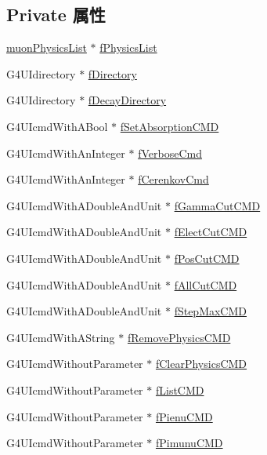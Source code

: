 \subsection*{Private 属性}
\begin{DoxyCompactItemize}
\item 
\hyperlink{classmuonPhysicsList}{muon\+Physics\+List} $\ast$ \hyperlink{classmuonPhysicsListMessenger_af6b4b50ac8d5f0745a42b138fdf872f9}{f\+Physics\+List}
\item 
G4\+U\+Idirectory $\ast$ \hyperlink{classmuonPhysicsListMessenger_a6ee7d768e62e1a00503d2060e9bee390}{f\+Directory}
\item 
G4\+U\+Idirectory $\ast$ \hyperlink{classmuonPhysicsListMessenger_a32435dcc45f4dde0fee1029b44e4aafa}{f\+Decay\+Directory}
\item 
G4\+U\+Icmd\+With\+A\+Bool $\ast$ \hyperlink{classmuonPhysicsListMessenger_a398a6f1a2d158f23ad9222bde55d3d9a}{f\+Set\+Absorption\+C\+MD}
\item 
G4\+U\+Icmd\+With\+An\+Integer $\ast$ \hyperlink{classmuonPhysicsListMessenger_ae032d089539eecc8f2a87eca11fa02f0}{f\+Verbose\+Cmd}
\item 
G4\+U\+Icmd\+With\+An\+Integer $\ast$ \hyperlink{classmuonPhysicsListMessenger_a9acd26079a72ece9f113dd902d49e906}{f\+Cerenkov\+Cmd}
\item 
G4\+U\+Icmd\+With\+A\+Double\+And\+Unit $\ast$ \hyperlink{classmuonPhysicsListMessenger_a17bfc84c38f5a7dbed27346d163f8211}{f\+Gamma\+Cut\+C\+MD}
\item 
G4\+U\+Icmd\+With\+A\+Double\+And\+Unit $\ast$ \hyperlink{classmuonPhysicsListMessenger_a13cc1337b7240bddf8441fe954ff3f05}{f\+Elect\+Cut\+C\+MD}
\item 
G4\+U\+Icmd\+With\+A\+Double\+And\+Unit $\ast$ \hyperlink{classmuonPhysicsListMessenger_aa7ebd0572c39450e325066477edac6dc}{f\+Pos\+Cut\+C\+MD}
\item 
G4\+U\+Icmd\+With\+A\+Double\+And\+Unit $\ast$ \hyperlink{classmuonPhysicsListMessenger_a562ca746cac592ca7ddd74d1c6ff9cb6}{f\+All\+Cut\+C\+MD}
\item 
G4\+U\+Icmd\+With\+A\+Double\+And\+Unit $\ast$ \hyperlink{classmuonPhysicsListMessenger_ad4e81b3c875881fd9ddf76ed6579a1ce}{f\+Step\+Max\+C\+MD}
\item 
G4\+U\+Icmd\+With\+A\+String $\ast$ \hyperlink{classmuonPhysicsListMessenger_aea5967d0469b160e5cc794f526b237ed}{f\+Remove\+Physics\+C\+MD}
\item 
G4\+U\+Icmd\+Without\+Parameter $\ast$ \hyperlink{classmuonPhysicsListMessenger_a4bd2cf554f1e6fc167657caf5972c380}{f\+Clear\+Physics\+C\+MD}
\item 
G4\+U\+Icmd\+Without\+Parameter $\ast$ \hyperlink{classmuonPhysicsListMessenger_acc9bb01bde03d55c5edafcd079089075}{f\+List\+C\+MD}
\item 
G4\+U\+Icmd\+Without\+Parameter $\ast$ \hyperlink{classmuonPhysicsListMessenger_af78666885421129435e6c70eba34ae9f}{f\+Pienu\+C\+MD}
\item 
G4\+U\+Icmd\+Without\+Parameter $\ast$ \hyperlink{classmuonPhysicsListMessenger_a1b49f8d7f33337340a8faa290f4d5c76}{f\+Pimunu\+C\+MD}
\end{DoxyCompactItemize}


